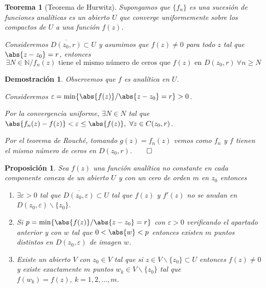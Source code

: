 \documentclass[10pt]{book}
\newtheorem{theorem}{Teorema}[chapter]
\newtheorem{prop}{Proposición}[chapter]
\newtheorem*{dem}{Demostración}
\newcommand{\N}{\mathbb{N}}
\begin{document}
\begin{theorem}[Teorema de Hurwitz]
Supongamos que $\{f_n\}$ es una sucesión de funciones analíticas es un abierto $U$ que converge uniformemente sobre los compactos de $U$ a una función $f(z)$.

Consideremos $\overline{D(z_0,r)}\subset U$ y asumimos que $f(z)\neq 0$ para todo $z$ tal que $\abs{z-z_0}=r$, entonces
$$
\exists N\in\N / f_n(z) \text{ tiene el mismo número de ceros que } f(z) \text{ en } D(z_0,r)\ \forall n\geq N
$$
\end{theorem}

\begin{dem}
Observemos que $f$ es analítica en $U$.

Consideremos $\varepsilon = \min\{\abs{f(z)}/\abs{z-z_0}= r\}>0$.

Por la convergencia uniforme, $\exists N \in N$ tal que $\abs{f_n(z)-f(z)}<\varepsilon \leq \abs{f(z)},\ \forall z\in C(z_0,r)$.

Por el teorema de Rouché, tomando $g(z) = f_n(z)$ vemos como $f_n$ y $f$ tienen el mismo número de ceros en $D(z_0,r)$.$\qed$
\end{dem}

\begin{prop}
Sea $f(z)$ una función analítica no constante en cada componente conexa de un abierto $U$ y con un cero de orden $m$ en $z_0$ entonces 
\begin{enumerate}
\item $\exists \varepsilon>0$ tal que $\overline{D(z_0,\varepsilon)}\subset U$ tal que $f(z)$ y $f'(z)$ no se anulan en $D(z_0,\varepsilon)\backslash\{z_0\}$.
\item Si $p = \min\{\abs{f(z)}/ \abs{z-z_0}=r\}$ con $\varepsilon >0$ verificando el apartado anterior y con $w$ tal que $0<\abs{w}<p$ entonces existen $m$ puntos distintos en $D(z_0,\varepsilon)$ de imagen $w$.
\item Existe un abierto $V$ con $z_0\in V$ tal que si $z\in V\backslash\{z_0\}\subset U$ entonces $f(z)\neq 0$ y existe exactamente $m$ puntos $w_k\in V\backslash\{z_0\}$ tal que $f(w_k) = f(z),\ k = 1,2,\ldots,m$.
\end{enumerate}
\end{prop}
\end{document}
